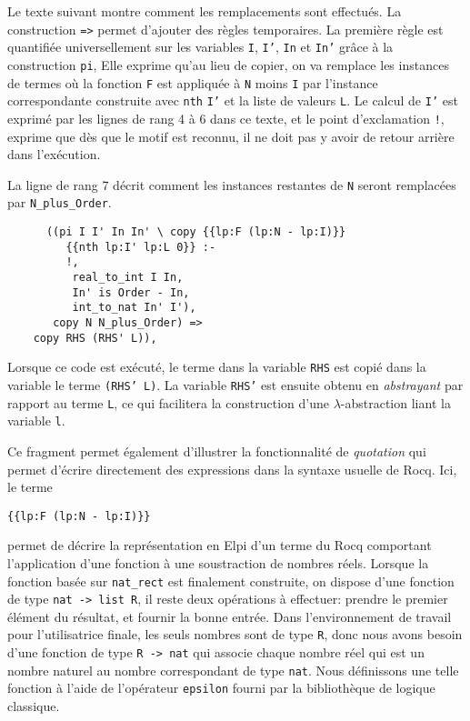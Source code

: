 \documentclass[draft]{jflart}
\begin{document}
Le texte suivant montre comment les remplacements sont effectués.  La
construction \texttt{=>} permet d'ajouter des règles temporaires.
La première règle est quantifiée universellement sur les variables
\texttt{I}, \texttt{I'}, \texttt{In} et \texttt{In'} grâce à la construction \texttt{pi},
Elle exprime qu'au lieu de copier, on va remplace les instances de termes
où la fonction \texttt{F} est
appliquée à \texttt{N} moins \texttt{I} par l'instance
correspondante construite avec \texttt{nth} \texttt{I'} et la liste de
valeurs
\texttt{L}.  Le calcul de \texttt{I'} est exprimé par les lignes de rang 4 à 6 dans
ce texte, et le point d'exclamation \texttt{!}, exprime que dès que le
motif est reconnu, il ne doit pas y avoir de retour arrière dans l'exécution.

La ligne de rang 7 décrit comment les instances restantes de \texttt{N} seront
remplacées par \texttt{N\_plus\_Order}.
\begin{verbatim}
      ((pi I I' In In' \ copy {{lp:F (lp:N - lp:I)}}
         {{nth lp:I' lp:L 0}} :-
         !,
          real_to_int I In,
          In' is Order - In,
          int_to_nat In' I'),
       copy N N_plus_Order) =>
    copy RHS (RHS' L)),
\end{verbatim}
Lorsque ce code est exécuté, le terme dans la variable \texttt{RHS} est copié
dans la variable le terme \texttt{(RHS' L)}.  La variable \texttt{RHS'} est ensuite
obtenu en {\em abstrayant} par rapport au terme \texttt{L}, ce qui facilitera
la construction d'une \(\lambda\)-abstraction liant la variable \texttt{l}.

Ce fragment permet également d'illustrer la fonctionnalité de {\em
  quotation} qui permet d'écrire directement des expressions dans la
syntaxe usuelle de Rocq.  Ici, le terme
\begin{center}
\texttt{\{\{lp:F (lp:N -  lp:I)\}\}}
\end{center}
permet de décrire la représentation en Elpi d'un terme du
Rocq comportant l'application d'une fonction à une soustraction de
nombres réels.
Lorsque la fonction basée sur \texttt{nat\_rect} est finalement
construite, on dispose d'une fonction de type \texttt{nat -> list R}, il
reste deux opérations à effectuer: prendre le premier élément du
résultat, et fournir la bonne entrée.  Dans l'environnement de travail
pour l'utilisatrice finale, les seuls nombres sont de type \texttt{R},
donc nous avons besoin d'une fonction de type \texttt{R -> nat} qui
associe chaque nombre réel qui est un nombre naturel au nombre
correspondant de type \texttt{nat}.  Nous définissons une telle fonction
à l'aide de l'opérateur \texttt{epsilon} fourni par la bibliothèque de
logique classique.
\end{document}
